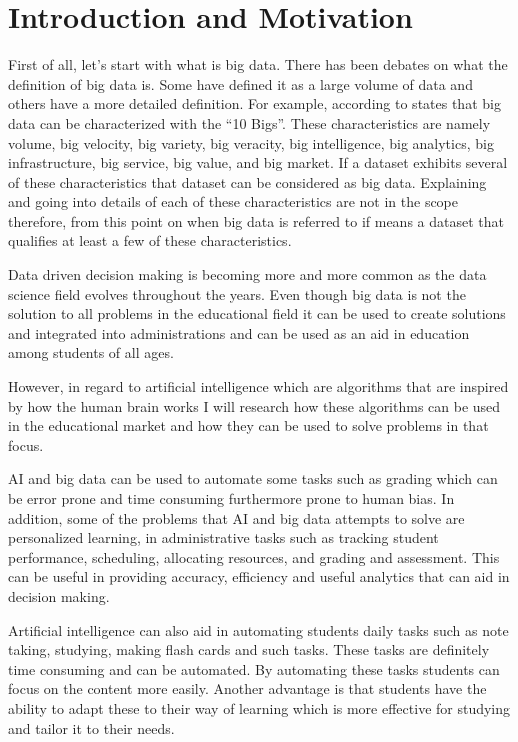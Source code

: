 \documentclass{imc-inf}
\begin{document}
\section{Introduction and Motivation }
First of all, let’s start with what is big data. There has been debates on what the definition of big data is. Some have defined it as a large volume of data and others have a more detailed definition. For example, according to \cite{1} states that big data can be characterized with the “10 Bigs”. These characteristics are namely volume, big velocity, big variety, big veracity, big intelligence, big analytics, big infrastructure, big service, big value, and big market. If a dataset exhibits several of these characteristics that dataset can be considered as big data. Explaining and going into details of each of these characteristics are not in the scope therefore, from this point on when big data is referred to if means a dataset that qualifies at least a few of these characteristics. 


Data driven decision making is becoming more and more common as the data science field evolves throughout the years. Even though big data is not the solution to all problems in the educational field it can be used to create solutions and integrated into administrations and can be used as an aid in education among students of all ages. 


However, in regard to artificial intelligence which are algorithms that are inspired by how the human brain works I will research how these algorithms can be used in the educational market and how they can be used to solve problems in that focus. 

AI and big data can be used to automate some tasks such as grading which can be error prone and time consuming furthermore prone to human bias. In addition, some of the problems that AI and big data attempts to solve are personalized learning, in administrative tasks such as tracking student performance, scheduling, allocating resources, and grading and assessment. This can be useful in providing accuracy, efficiency and useful analytics that can aid in decision making. 

Artificial intelligence can also aid in automating students daily tasks such as note taking, studying, making flash cards and such tasks. These tasks are definitely time consuming and can be automated. By automating these tasks students can focus on the content more easily. Another advantage is that students have the ability to adapt these to their way of learning which is more effective for studying and tailor it to their needs. 
\end{document}
